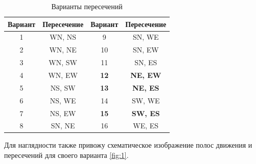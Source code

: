 \documentclass[12pt]{article}
\begin{document}
\begin{table}[h!]
  \centering
  \begin{tabular}{| c | c || c | c |}
    \hline
      \textbf{Вариант}  & \textbf{Пересечение}  & \textbf{Вариант}  & \textbf{Пересечение}   \\
    \hline
            1        &  WN, NS        &  9        &  SN, WE  \\
    \hline
            2        &  WN, NE        &  10        &  SN, EW  \\
    \hline
            3        &  WN, SW        &  11        &  SN, ES  \\
    \hline
            4        &  WN, EW        &  \textbf{12} & \textbf{NE, EW}  \\
    \hline
            5        &  NS, SW        &  \textbf{13} &  \textbf{NE, ES}  \\
    \hline
            6        &  NS, WE        &  14        &  SW, WE  \\
    \hline
            7        &  NS, EW        &  \textbf{15} &  \textbf{SW, ES}  \\
    \hline
            8        &  SN, NE        &  16        &  WE, ES  \\
    \hline
  \end{tabular}
  \caption{Варианты пересечений}
  \label{table:1}
\end{table}

Для наглядности также привожу схематическое изображение полос движения и пересечений для своего
варианта \ref{fig:1}.
\end{document}
